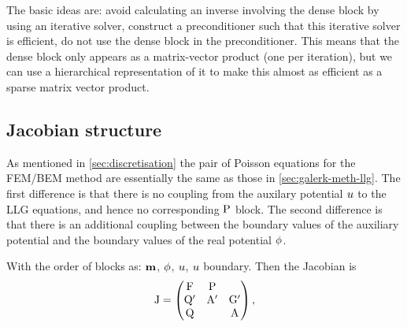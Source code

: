 The basic ideas are: avoid calculating an inverse involving the dense block by using an iterative solver, construct a preconditioner such that this iterative solver is efficient, do not use the dense block in the preconditioner.
This means that the dense block only appears as a matrix-vector product (one per iteration), but we can use a hierarchical representation of it to make this almost as efficient as a sparse matrix vector product.


\subsection{Jacobian structure}
\label{sec:bem-jacobian-structure}

As mentioned in \cref{sec:discretisation} the pair of Poisson equations for the FEM/BEM method are essentially the same as those in \cref{sec:galerk-meth-llg}.
The first difference is that there is no coupling from the auxilary potential $u$ to the LLG equations, and hence no corresponding $\mathrm{P}$ block.
The second difference is that there is an additional coupling between the boundary values of the auxiliary potential and the boundary values of the real potential $\phi$.

With the order of blocks as: $\mathbf{m}$, $\phi$, $u$, $u$ boundary.
Then the Jacobian is
\begin{equation}
  \mathrm{J} = 
  \begin{pmatrix}
    \mathrm{F}       & \mathrm{P}     &  \\
    \mathrm{Q}'      & \mathrm{A}' &  {\mathbf{\mathrm{G}}}'  \\
    \mathrm{Q}       &         &   \mathrm{A}
  \end{pmatrix},
\end{equation}


